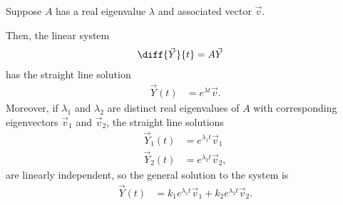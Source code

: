 \documentclass[10pt]{mypackage}
\begin{document}
\begin{theorem}
  Suppose $A$ has a real eigenvalue $\lambda$ and associated vector $\vec{v}$.\newline

  Then, the linear system
  \begin{align*}
    \diff{\vec{Y}}{t} &= A\vec{Y}
  \end{align*}
  has the straight line solution
  \begin{align*}
    \vec{Y}(t) &= e^{\lambda t}\vec{v}.
  \end{align*}
  Moreover, if $\lambda_1$ and $\lambda_2$ are distinct real eigenvalues of $A$ with corresponding eigenvectors $\vec{v}_1$ and $\vec{v}_2$, the straight line solutions
  \begin{align*}
    \vec{Y}_1(t) &= e^{\lambda_1 t}\vec{v}_1\\
    \vec{Y}_2(t) &= e^{\lambda_2 t}\vec{v}_2,
  \end{align*}
  are linearly independent, so the general solution to the system is
  \begin{align*}
    \vec{Y}(t) &= k_1e^{\lambda_1 t}\vec{v}_1 + k_2e^{\lambda_2 t}\vec{v}_2.
  \end{align*}
\end{theorem}
\end{document}
